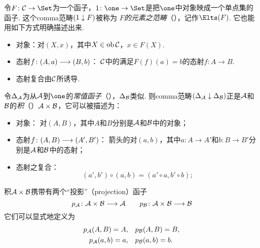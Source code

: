   \begin{exam}
    令$F\colon\Cc\to\Set$为一个函子，$1\colon\one\to\Set$是把$\one$中对象映成一个单点集的函子. 这个comma范畴$(1\downarrow F)$被称为 \emph{$F$的元素之范畴}（），记作$\Elts(F)$. 它也能用如下方式明确描述出来.
  \begin{itemize}
    \item 对象：对$(X,x)$，其中$X\in\operatorname{ob}{\cal C}$，$x\in F(X)$.
    \item 态射$f\colon(A,a)\longrightarrow(B,b)$：
               ${\cal C}$中的满足$F(f)(a)=b$的态射$f\colon A\to B$.
    \item 态射复合由${\cal C}$所诱导.
  \end{itemize}
  \end{exam}

  \begin{exam}
     令$\Delta_{{\cal A}}$为从${\cal A}$到$\one$的\emph{常值函子}（），$\Delta_{{\cal B}}$类似.
     则comma范畴$(\Delta_{{\cal A}}\downarrow\Delta_{{\cal B}})$正是${\cal A}$和${\cal B}$的\emph{积}（）${\cal A}\times{\cal B}$，它可以被描述为：
  \begin{itemize}
    \item 对象：
               对$(A, B)$，其中$A$和$B$分别是${\cal A}$和${\cal B}$中的对象；
    \item 态射$f\colon(A,B)\longrightarrow(A',B')$：
               箭头的对$(a,b)$，其中$a\colon A\to A'$和$b\colon B\to B'$分别是${\cal A}$和${\cal B}$中的态射；
    \item 态射之复合：
                                    \begin{equation*}
                                      (a', b') \circ (a, b) = (a' \circ a, b' \circ b);
                                    \end{equation*}
  \end{itemize}
  \end{exam}
  积${\cal A}\times{\cal B}$携带有两个``投影''（projection）函子
  \begin{equation*}
    p_{{\cal A}}\colon{\cal A}\times{\cal B}\longrightarrow{\cal A}\qquad p_{{\cal B}}\colon{\cal A}\times{\cal B}\longrightarrow{\cal B}
  \end{equation*}
  它们可以显式地定义为
  \begin{align*}
    p_{{\cal A}}(A,B)=A,&\quad p_{{\cal B}}(A,B) = B,\\
    p_{{\cal A}}(a,b) =a,&\quad p_{{\cal B}}(a,b) = b.
  \end{align*}

